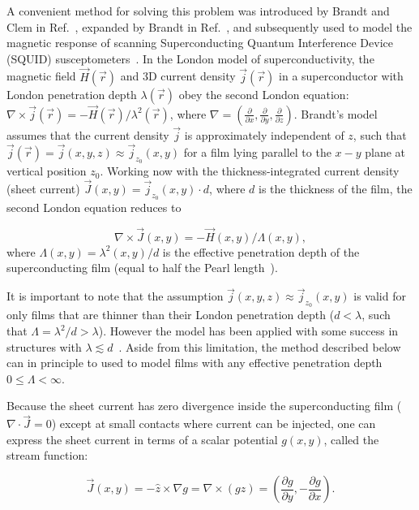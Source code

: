 \documentclass[final,3p,times]{elsarticle}
\newcounter{bla}
\begin{document}
A convenient method for solving this problem was introduced by Brandt and Clem in Ref.~\cite{Brandt_Clem_2004}, expanded by Brandt in Ref.~\cite{brandt_thin_2005}, and subsequently used to model the magnetic response of scanning Superconducting Quantum Interference Device (SQUID) susceptometers~\cite{kirtley_scanning_2016, kirtley_response_2016}. In the London model of superconductivity, the magnetic field $\vec{H}(\vec{r})$ and 3D current density $\vec{j}(\vec{r})$ in a superconductor with London penetration depth $\lambda(\vec{r})$ obey the second London equation:
$\nabla\times\vec{j}(\vec{r})=-\vec{H}(\vec{r})/\lambda^2(\vec{r})$, where
$\nabla=\left(\frac{\partial}{\partial x}, \frac{\partial}{\partial y}, \frac{\partial}{\partial z}\right)$. Brandt's model assumes that the current density $\vec{j}$ is approximately independent of $z$, such that  $\vec{j}(\vec{r}) = \vec{j}(x, y, z)\approx\vec{j}_{z_0}(x, y)$ for a film lying parallel to the $x-y$ plane at vertical position $z_0$. Working now with the thickness-integrated current density (sheet current) $\vec{J}(x, y)=\vec{j}_{z_0}(x, y)\cdot d$, where $d$
is the thickness of the film, the second London equation reduces to

\begin{equation}
    \label{eq:london}
    \nabla\times\vec{J}(x, y)=-\vec{H}(x, y)/\Lambda(x, y),
\end{equation}
where $\Lambda(x, y)=\lambda^2(x, y)/d$ is the effective penetration depth
of the superconducting film (equal to half the Pearl length~\cite{pearl_current_1964}).

It is important to note that the assumption $\vec{j}(x, y, z)\approx\vec{j}_{z_0}(x, y)$ is valid for only films that are thinner than their London penetration depth ($d<\lambda$, such that $\Lambda=\lambda^2/d>\lambda$). However the model has been applied with some success in structures with $\lambda\lesssim d$~\cite{kirtley_scanning_2016,kirtley_response_2016}. Aside from this limitation, the method described below can in principle to used to model films with any effective penetration depth $0\leq\Lambda<\infty$.

Because the sheet current has zero divergence inside the superconducting film ($\nabla\cdot\vec{J}=0$)
except at small contacts where current can be injected, one can express the sheet current in terms
of a scalar potential $g(x, y)$, called the stream function:

\begin{equation}
    \label{eq:stream}
    \vec{J}(x, y) = -\hat{z}\times\nabla g
    = \nabla\times(g\hat{z})
    = \left(\frac{\partial g}{\partial y}, -\frac{\partial g}{\partial x}\right).
\end{equation}
\end{document}
